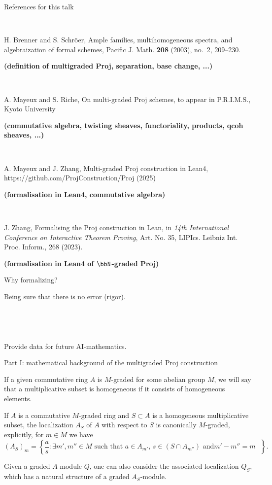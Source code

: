 \documentclass[9pt]{beamer}
\begin{document}
\begin{frame}{References for this talk }

$~~$

H. Brenner and S. Schr\"oer, Ample families, multihomogeneous spectra, and algebraization of formal schemes, Pacific J. Math. {\bf 208} (2003), no.~2, 209--230.

\textbf{
(definition of multigraded Proj, separation, base change, ...)}

$~~$

A. Mayeux and S. Riche, On multi-graded Proj schemes, to appear in P.R.I.M.S., Kyoto University

\textbf{
(commutative algebra, twisting sheaves, functoriality, products, qcoh sheaves, ...)}

$~~$


A. Mayeux and J. Zhang, Multi-graded Proj construction in Lean4, https://github.com/ProjConstruction/Proj (2025)

\textbf{
(formalisation in Lean4, commutative algebra)}

$~~$

J. Zhang, Formalising the Proj construction in Lean, in {\it 14th International Conference on Interactive Theorem Proving}, Art. No. 35, LIPIcs. Leibniz Int. Proc. Inform., 268 (2023).

\textbf{
(formalisation in Lean4 of $\bbN$-graded Proj)}
\end{frame}


\begin{frame}{Why formalizing? }

Being sure that there is no error (rigor).

$~~$

$~~$

Provide data for future AI-mathematics.




\end{frame}


\begin{frame} \begin{center}Part I: mathematical background of the multigraded Proj construction\end{center}
\end{frame}
\begin{frame}
If a given commutative ring $A$ is $M$-graded for some abelian group $M$, we will say that a multiplicative subset is homogeneous if it consists of homogeneous elements. 

If $A$ is a commutative $M$-graded ring and $S \subset A$ is a homogeneous multiplicative subset, the localization $A_S$ of $A$ with respect to $S$ is canonically $M$-graded, explicitly, for $m \in M$ we have
\[
( A_S)_m =  \left\{ \frac{a}{s} : \exists m', m'' \in M \text{ such that }  a \in A_{m'}, \, s \in (S \cap A_{m''}) \text{ and
$m'-m'' =m$ }\right\}.
\]


Given a graded $A$-module $Q$, one can also consider the associated localization $Q_S$, which has a natural structure of a graded $A_S$-module.

\end{frame}
\end{document}
